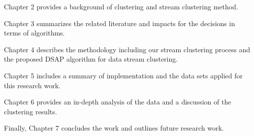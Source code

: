 Chapter 2 provides a background of clustering and stream clustering method. 

Chapter 3 summarizes the related literature and impacts for the decisions in terms of algorithms.

Chapter 4 describes the methodology including our stream clustering process and the proposed DSAP algorithm for data stream clustering.

Chapter 5 includes a summary of implementation and the data sets applied for this research work.

Chapter 6 provides an in-depth analysis of the data and a discussion of the clustering results.

Finally, Chapter 7 concludes the work and outlines future research work.
% 







